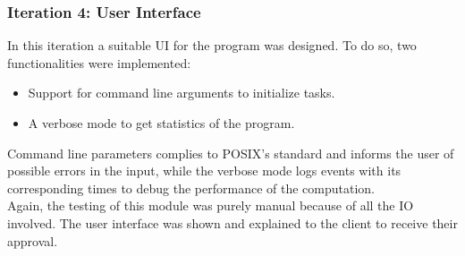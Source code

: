 
      \subsubsection{Iteration 4: User Interface}

      In this iteration a suitable UI for the program was designed. To do so,
      two functionalities were implemented:
      \begin{itemize}
        \item Support for command line arguments to initialize tasks.
        \item A verbose mode to get statistics of the program.
      \end{itemize}

      Command line parameters complies to POSIX's standard and informs the
      user of possible errors in the input, while the verbose mode logs events
      with its corresponding times to debug the performance of the
      computation.\\

      Again, the testing of this module was purely manual because of all
      the IO involved. The user interface was shown and explained to the client
      to receive their approval.\\
